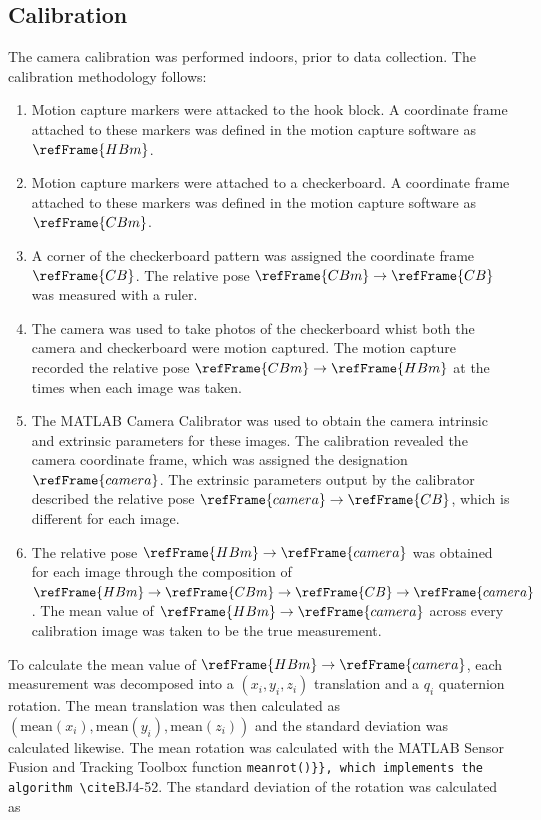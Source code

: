 \documentclass[11pt]{article}
\newcommand{\code}[1]{\colorbox{bj-light-gray}{\Verb{#1}}}
\begin{document}
\subsection*{Calibration}
The camera calibration was performed indoors, prior to data collection. The calibration methodology follows:
\begin{enumerate}
    \item Motion capture markers were attacked to the hook block. A coordinate frame attached to these markers was defined in the motion capture software as $\refFrame{HBm}$.
    \item Motion capture markers were attached to a checkerboard. A coordinate frame attached to these markers was defined in the motion capture software as $\refFrame{CBm}$.
    \item A corner of the checkerboard pattern was assigned the coordinate frame $\refFrame{CB}$. The relative pose $\refFrame{CBm}\rightarrow\refFrame{CB}$ was measured with a ruler.
    \item The camera was used to take photos of the checkerboard whist both the camera and checkerboard were motion captured. The motion capture recorded the relative pose $\refFrame{CBm}\rightarrow\refFrame{HBm}$ at the times when each image was taken.
    \item The MATLAB Camera Calibrator was used to obtain the camera intrinsic and extrinsic parameters for these images. The calibration revealed the camera coordinate frame, which was assigned the designation $\refFrame{camera}$. The extrinsic parameters output by the calibrator described the relative pose $\refFrame{camera}\rightarrow\refFrame{CB}$, which is different for each image.
    \item The relative pose $\refFrame{HBm}\rightarrow\refFrame{camera}$ was obtained for each image through the composition of $\refFrame{HBm}\rightarrow\refFrame{CBm}\rightarrow\refFrame{CB}\rightarrow\refFrame{camera}$. The mean value of $\refFrame{HBm}\rightarrow\refFrame{camera}$ across every calibration image was taken to be the true measurement.
\end{enumerate}

To calculate the mean value of $\refFrame{HBm}\rightarrow\refFrame{camera}$, each measurement was decomposed into a $(x_i, y_i, z_i)$ translation and a $q_i$ quaternion rotation. The mean translation was then calculated as \\$(\text{mean}(x_i), \text{mean}(y_i), \text{mean}(z_i))$ and the standard deviation was calculated likewise. The mean rotation was calculated with the MATLAB Sensor Fusion and Tracking Toolbox function \code{meanrot()}, which implements the algorithm \cite{BJ4-52}. The standard deviation of the rotation was calculated as
\end{document}
